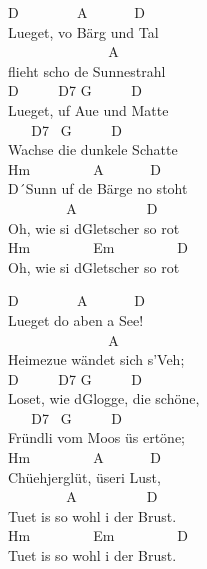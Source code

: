 \documentclass[
  letterpaper,
  twoside=false]{scrbook}
\begin{document}
D ~ ~ ~ ~ ~A ~ ~ ~ ~D\\
Lueget, vo Bärg und Tal\\
\hspace*{0.333em} ~ ~ ~ ~ ~ ~ ~ ~ ~A\\
flieht scho de Sunnestrahl\\
D ~ ~ ~ D7 G ~ ~ ~ D\\
Lueget, uf Aue und Matte\\
\hspace*{0.333em} ~ ~ D7 ~G ~ ~ ~ D\\
Wachse die dunkele Schatte\\
Hm ~ ~ ~ ~ ~ A ~ ~ ~ ~D\\
D´Sunn uf de Bärge no stoht\\
\hspace*{0.333em} ~ ~ ~ ~ ~ A ~ ~ ~ ~ ~ ~D\\
Oh, wie si d\textquotesingle Gletscher so rot\\
Hm ~ ~ ~ ~ ~ Em ~ ~ ~ ~ ~ D\\
Oh, wie si d\textquotesingle Gletscher so rot

D ~ ~ ~ ~ ~A ~ ~ ~ ~D\\
Lueget do aben a See!\\
\hspace*{0.333em} ~ ~ ~ ~ ~ ~ ~ ~ ~A\\
Heimezue wändet sich s'Veh;\\
D ~ ~ ~ D7 G ~ ~ ~ D\\
Loset, wie d\textquotesingle Glogge, die schöne,\\
\hspace*{0.333em} ~ ~ D7 ~G ~ ~ ~ D\\
Fründli vom Moos üs ertöne;\\
Hm ~ ~ ~ ~ ~ A ~ ~ ~ ~D\\
Chüehjerglüt, üseri Lust,\\
\hspace*{0.333em} ~ ~ ~ ~ ~ A ~ ~ ~ ~ ~ ~D\\
Tuet is so wohl i der Brust.\\
Hm ~ ~ ~ ~ ~ Em ~ ~ ~ ~ ~ D\\
Tuet is so wohl i der Brust.
\end{document}
